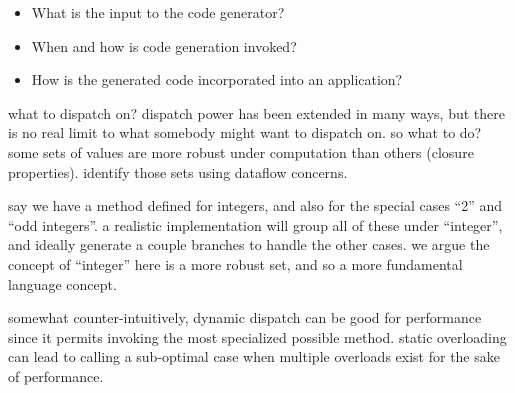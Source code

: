 \vspace{-2ex}
\begin{singlespace}
\begin{itemize}
\item What is the input to the code generator?
\item When and how is code generation invoked?
\item How is the generated code incorporated into an application?
\end{itemize}
\end{singlespace}





what to dispatch on? dispatch power has been extended in many ways, but
there is no real limit to what somebody might want to dispatch on.
so what to do?
some sets of values are more robust under computation than others
(closure properties).
identify those sets using dataflow concerns.

say we have a method defined for integers, and also for the special cases
``2'' and ``odd integers''. a realistic implementation
will group all of these under ``integer'', and ideally generate a couple
branches to handle the other cases. we argue the concept of ``integer''
here is a more robust set, and so a more fundamental language concept.


somewhat counter-intuitively, dynamic dispatch can be good for performance
since it permits invoking the most specialized possible method.
static overloading can lead to calling a sub-optimal case when multiple
overloads exist for the sake of performance.






